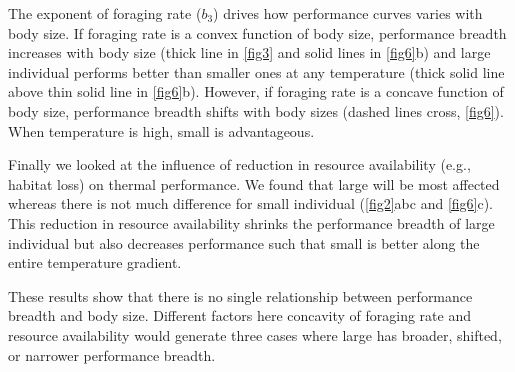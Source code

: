 The exponent of foraging rate ($b_3$) drives how performance curves varies with body size.
If foraging rate is a convex function of body size, performance breadth increases with body size (thick line in \cref{fig3} and solid lines in \cref{fig6}b) and large individual performs better than smaller ones at any temperature (thick solid line above thin solid line in \cref{fig6}b).
However, if foraging rate is a concave function of body size, performance breadth shifts with body sizes (dashed lines cross, \cref{fig6}).
When temperature is high, small is advantageous.
   
Finally we looked at the influence of reduction in resource availability (e.g., habitat loss) on thermal performance.
We found that large will be most affected whereas there is not much difference for small individual (\cref{fig2}abc and \cref{fig6}c).
This reduction in resource availability shrinks the performance breadth of large individual but also decreases performance such that small is better along the entire temperature gradient.

These results show that there is no single relationship between performance breadth and body size. 
Different factors here concavity of foraging  rate and resource availability would generate three cases where large has broader, shifted, or narrower performance breadth.

